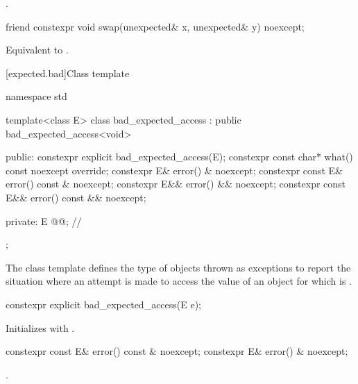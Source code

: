 \begin{addedblock}
\begin{itemdescr}
\pnum
\returns
{}.
\end{itemdescr}

%
\begin{itemdecl}
friend constexpr void swap(unexpected& x, unexpected& y) noexcept;
\end{itemdecl}

\begin{itemdescr}
\pnum
\effects
Equivalent to .
\end{itemdescr}
\end{addedblock}

[expected.bad]{Class template }

%
\begin{codeblock}
namespace std {
  template<class E>
  class bad_expected_access : public bad_expected_access<void> {
  public:
    constexpr explicit bad_expected_access(E);
    constexpr const char* what() const noexcept override;
    constexpr E& error() & noexcept;
    constexpr const E& error() const & noexcept;
    constexpr E&& error() && noexcept;
    constexpr const E&& error() const && noexcept;

  private:
    E @@;             // \expos
  };
}
\end{codeblock}

\pnum
The class template 
defines the type of objects thrown as exceptions to report the situation
where an attempt is made to access the value of an  object
for which  is .

%
\begin{itemdecl}
constexpr explicit bad_expected_access(E e);
\end{itemdecl}

\begin{itemdescr}
\pnum
\effects
Initializes  with .
\end{itemdescr}

%
\begin{itemdecl}
constexpr const E& error() const & noexcept;
constexpr E& error() & noexcept;
\end{itemdecl}

\begin{itemdescr}
\pnum
\returns
{}.
\end{itemdescr}

